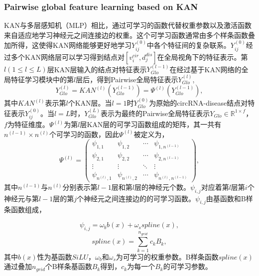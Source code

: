 \documentclass{bioinfo}
\begin{document}
\begin{methods}
\subsubsection{Pairwise global feature learning based on KAN}
KAN与多层感知机（MLP）相比，通过可学习的函数代替权重参数以及激活函数来自适应地学习神经元之间连接边的权重。这个可学习函数通常由多个样条函数叠加所得，这使得KAN网络能够更好地学习${Y_{ij}^{(0)}}$中各个特征间的复杂联系。${Y_{ij}^{(0)}}$经过多个KAN网络层可以学习得到结点对$[v_i^{cir},d_j^{dis}]$在全局视角下的特征表示。第$l(1\leqslant l\leqslant L)$层KAN层输入的结点对特征表示$Y_{Glo}^{(l - 1)}$在经过基于KAN网络的全局特征学习模块中的第$l$层后，得到Pairwise全局特征表示${Y}_{Glo}^{(l)}$,
\begin{equation}
	{Y}_{Glo}^{(l)} = KAN^{(l)}(Y_{Glo}^{(l - 1)}) = \varPsi^{(l)}(Y_{Glo}^{(l - 1)}),
\end{equation}
其中$KAN^{(l)}$表示第$l$个KAN层。当$l=1$时$Y_{Glo}^{(0)}$为原始的circRNA-disease结点对特征表示$Y_{ij}^{(0)}$。当$l=L$时，$Y_{Glo}^{(L)}$表示为最终的Pairwise全局特征表示${Y}_{Glo} \in \mathbb{R}^{1\times f}$，$f$为特征维度。$\varPsi^{(l)}$为第$l$层KAN层的可学习函数组成的矩阵，其一共有$n^{(l - 1)} \times n^{(l)}$个可学习的函数，因此$\varPsi^{(l)}$被定义为，
\begin{equation}
	\varPsi^{(l)} = \left(
	\begin{array}{cccc}
		\psi_{1,1} & \psi_{1,2} & \cdots & \psi_{1,n^{(l-1)}} \\
		\psi_{2,1} & \psi_{2,2} & \cdots & \psi_{2,n^{(l-1)}} \\
		\vdots & \vdots & \ddots & \vdots \\
		\psi_{n^{(l)},1} & \psi_{n^{(l)},2} & \cdots & \psi_{n^{(l)},n^{(l-1)}}
	\end{array}
	\right),
\end{equation}
其中$n^{(l - 1)}$与$n^{(l)}$分别表示第$l - 1$层和第$l$层的神经元个数。$\psi_{i,j}$对应着第$l$层第$i$个神经元与第$l - 1$层的第$j$个神经元之间连接边的的可学习函数。$\psi_{i,j}$由基函数和B样条函数组成，

\begin{equation}
	\psi_{i,j} = \omega_{b}b(x) + \omega_{s}spline(x),
\end{equation}
\begin{equation}
	spline(x) = \sum_{k = 1}^{n_{grid}}c_{k} B_{k},
\end{equation}
其中$b(x)性$为基函数${SiLU}$，$\omega_{b}$和$\omega_{s}$为可学习的权重参数。B样条函数$spline(x)$通过叠加$n_{grid}$个B样条基函数$B_{k}$得到，$c_{k}$为每一个$B_{k}$的可学习参数。


\end{methods}
\end{document}
